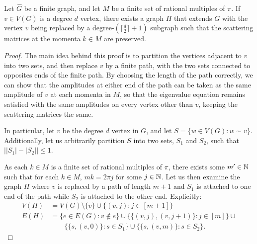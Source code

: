 \documentclass[../thesis-main/thesis-main]{subfiles}
\begin{document}
\begin{lemma} Let $\widehat{G}$ be a finite graph, and let $M$ be a finite set of rational multiples of $\pi$.  If $v\in V(G)$ is a degree $d$ vertex, there exists a graph $H$ that extends $G$ with the vertex $v$ being replaced by a degree-$(\lceil \frac{d}{2}\rceil +1)$ subgraph such that the scattering matrices at the momenta $k\in M$ are preserved.
\label{lem:degree_reduction}
\end{lemma}
\begin{proof}
  The main idea behind this proof is to partition the vertices adjacent to $v$ into two sets, and then replace $v$ by a finite path, with the two sets connected to opposites ends of the finite path.  By choosing the length of the path correctly, we can show that the amplitudes at either end of the path can be taken as the same amplitude of $v$ at each momenta in $M$, so that the eigenvalue equation remains satisfied with the same amplitudes on every vertex other than $v$, keeping the scattering matrices the same.  
  
  In particular, let $v$ be the degree $d$ vertex in $G$, and let $S = \{w\in V(G) : w\sim v\}$.  Additionally, let us arbitrarily partition $S$ into two sets, $S_1$ and $S_2$, such that $\big||S_1|-|S_2|\big| \leq 1$.
  
  As each $k\in M$ is a finite set of rational multiples of $\pi$, there exists some $m'\in \mathbb{N}$ such that for each $k\in M$, $mk = 2\pi j$ for some $j\in \mathbb{N}$.  Let us then examine the graph $H$ where $v$ is replaced by a path of length $m+1$ and $S_1$ is attached to one end of the path while $S_2$ is attached to the other end.  Explicitly:
  \begin{align}
    V(H) &= V(G)\setminus \{v\} \cup \{(v,j): j\in [m+1]\}\\
    E(H) &= \big\{ e\in E(G) : v\notin e\big\} \cup \big\{ \{(v,j),(v,j+1)\} : j\in [m]\big\} \cup \nonumber\\
    &\qquad \big\{ \{s, (v,0)\} : s\in S_1\big\} \cup \big\{ \{s,(v,m)\} : s\in S_2\big\}.
  \end{align}
  

\end{proof}
\end{document}
